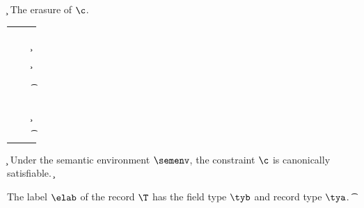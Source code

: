 \documentclass[acmsmall,screen,nonacm%
\Anonymous{,anonymous}{}%
\Final{}{,review}%
]{acmart}
\begin{document}
\begin{judgboxmathpar}
  {\cerase \c}
  {The erasure of $\c$.}
  \label{fig:erasure}
\newcommand{\Erule}[2]{\cerase {#1} &\eqdef& {#2}}
\begin{tabular}{RCL}
  \Erule{\ctrue}{\ctrue} \\
  \Erule{\cfalse}{\cfalse} \\
  \Erule{\ca \cand \cb}{\cerase \ca \cand \cerase \cb} \\
  \Erule{\cexists \tv \c}{\cexists \tv \cerase \c} \\
  \Erule{\cfor \tv \c}{\cfor \tv \cerase \c} \\
  \Erule{\cunif \ta \tb}{\cunif \ta \tb} \\
  \Erule{\clet \x \tv \ca \cb}{\clet \x \tv {\cerase \ca} {\cerase \cb}} \\
  \Erule{\capp \x \t}{\capp \x \t} \\
    \Erule{\cmatch \t {\cbranch {\bar \cpat} {\bar \c}}}{\ctrue} \\
  \Erule{\ueq}{\ueq} \\
  \Erule{\cletr \x \tv \tvs \ca \cb}{\cletr \x \tv \tvs {\cerase \ca} {\cerase \cb}} \\
  \Erule{\cexistsi \inst \x \c}{\cexistsi \inst \x \cerase \c}\\
  \Erule{\cpinst \inst \tv \t}{\cpinst \inst \tv \t}
\end{tabular}
\end{judgboxmathpar}

\begin{judgboxmathpar}
  {\semenv \Th \c}
  {Under the semantic environment $\semenv$,
   the constraint $\c$ is canonically satisfiable.}
  \label{fig:canonical-sem}
    {\semenv \Th \c}

    {\semenv \Th \C\where{\cmatch \t \cbrs}}
\end{judgboxmathpar}

\begin{judgboxmathpar}
  {{\labfrom \elab \T} \leq \tya \to \tyb}
  {The label $\elab$ of the record $\T$ has the field type $\tyb$ and record type $\tya$.}
    {{\labfrom \elab \T} \leq \trcd \T \tys \to \t\where{\tvs \is \tys} }
\end{judgboxmathpar}
\end{document}
